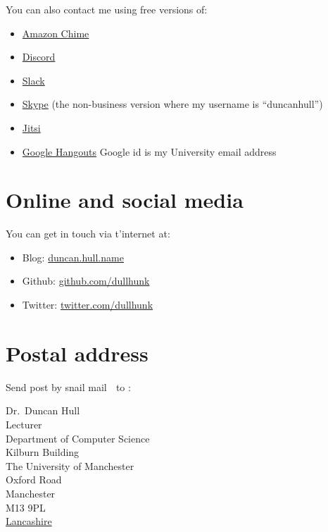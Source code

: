 \documentclass[
  12pt,
]{book}
\providecommand{\tightlist}{%
  \setlength{\itemsep}{0pt}\setlength{\parskip}{0pt}}
\begin{document}
You can also contact me using free versions of:

\begin{itemize}
\tightlist
\item
  \href{https://aws.amazon.com/chime/}{Amazon Chime}
\item
  \href{https://en.wikipedia.org/wiki/Discord_(software)}{Discord}
\item
  \href{https://en.wikipedia.org/wiki/Slack_(software)}{Slack}
\item
  \href{https://en.wikipedia.org/wiki/Skype}{Skype} (the non-business version where my username is ``duncanhull'')
\item
  \href{https://en.wikipedia.org/wiki/Jitsi}{Jitsi}
\item
  \href{https://en.wikipedia.org/wiki/Google_Hangouts}{Google Hangouts} Google id is my University email address
\end{itemize}

\hypertarget{online-and-social-media}{%
\section{Online and social media}\label{online-and-social-media}}

You can get in touch via t'internet at:

\begin{itemize}
\tightlist
\item
  Blog: \href{https://duncan.hull.name}{duncan.hull.name}
\item
  Github: \href{https://github.com/dullhunk}{github.com/dullhunk}
\item
  Twitter: \href{https://twitter.com/dullhunk}{twitter.com/dullhunk}
\end{itemize}

\hypertarget{postal-address}{%
\section{Postal address}\label{postal-address}}

Send post by snail mail 🐌 to :

Dr.~Duncan Hull\\
Lecturer\\
Department of Computer Science\\
Kilburn Building\\
The University of Manchester\\
Oxford Road\\
Manchester\\
M13 9PL\\
\href{https://duncan.hull.name/2019/07/05/mancashire/}{Lancashire} 🌹
\end{document}
